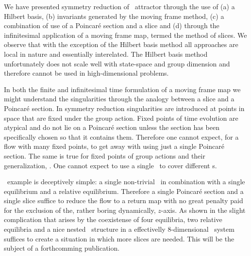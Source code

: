 
We have presented symmetry reduction of \CLe\ attractor through the use of
(a) a Hilbert basis,  (b) invariants generated by the moving frame method,
(c) a combination of use of a Poincar\'e section and a slice and (d) through
the infinitesimal application of a moving frame map, termed the method of
slices. We observe that with the exception of the Hilbert basis method all
approaches are local in nature and essentially interelated. The Hilbert basis
method unfortunately does not scale well with state-space and group dimension
and therefore cannot be used in high-dimensional problems.  

In both the finite and infinitesimal time formulation of a moving frame map 
we might understand the singularities through the analogy between a slice
and a Poincar\'e section. In symmetry reduction singularities 
are introduced at points in space that are fixed under the group action. 
Fixed points of time evolution are atypical and do not lie on a Poincar\'e section 
unless the section has been specifically chosen so that it contains them.
Therefore one cannot expect, for a flow with many fixed points, to
get away with using just a single Poincar\'e section. The same is
true for fixed points of group actions and their generalization, \fixedsp.
One cannot expect to use a single \slice\ to cover different \fixedsp s.

\CLe\ example is deceptively simple: a single non-trivial \fixedsp\ in combination
with a single equilibrium and a relative equilibrium. Therefore a single Poincar\'e
section and a single slice suffice to reduce the flow to a return map with no
great penalty paid for the exclusion of the, rather boring dynamically, $z$-axis. 
As shown in  the slight complication that arises by the
coexistense of four equilibria, two relative equilibria and a nice nested \fixedsp\
structure in a effectivelly $8$-dimensional \KS\ system 
suffices to create a situation in which more slices are needed. 
This will be the subject of a forthcomming publication\rf{SCD09b}.

